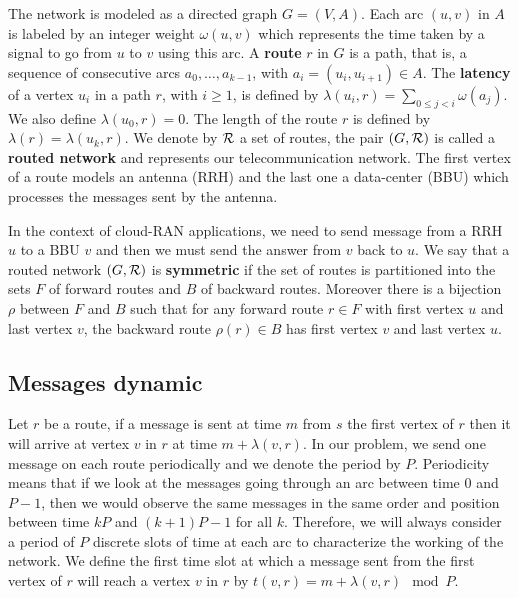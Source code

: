 \documentclass[10pt, conference, letterpaper]{IEEEtran}
\begin{document}
The network is modeled as a directed graph $G=(V,A)$. Each arc  $(u,v)$ in $A$ is labeled by an integer weight $\omega(u,v)$ which represents the time taken by a signal to go from $u$ to $v$ using this arc. A {\bf route} $r$ in $G$ is a path, that is, a sequence of consecutive arcs $a_0, \ldots , a_{k-1}$, with $a_i=(u_i,u_{i+1}) \in A$.  The {\bf latency} of a vertex $u_i$ in a path $r$, with $i \geq 1$, is defined by $\lambda(u_i,r)= \sum\limits_{0 \leq j <i} \omega(a_j)$. We also define $\lambda(u_0,r)=0$. The length of the route $r$ is defined by $\lambda (r)= \lambda (u_k,r)$.
We denote by $\cal R$ a set of routes, the pair $(G,\cal R)$ is called a {\bf routed network} and represents our telecommunication network.
The first vertex of a route models an antenna (RRH) and the last one a data-center (BBU) which processes the messages sent by the antenna.

   In the context of cloud-RAN applications, we need to send message from a RRH $u$ to a BBU $v$ and then 
      we must send the answer from $v$ back to $u$. We say that a routed network $(G, {\cal R})$ is \textbf{symmetric} if the set of routes is partitioned into the sets $F$ of forward routes and $B$ of backward routes. Moreover there is a bijection $\rho$ between $F$ and $B$ such that for any forward route $r \in F$ with first vertex $u$ and last vertex $v$, the backward route $\rho(r) \in B$ has first vertex $v$ and last vertex $u$.
      


   \subsection{Messages dynamic}
      
      Let $r$ be a route, if a message is sent at time $m$ from $s$ the first vertex of $r$ then it will arrive at vertex $v$ in $r$ at time $m + \lambda(v,r)$. In our problem, we send one message on each route periodically and we denote the period by $P$.
      Periodicity means that if we look at the messages going through an arc between time $0$ and $P-1$, then we would observe the same messages in the same order and position between time $kP$ and $(k+1)P -1$ for all $k$. 
      Therefore, we will always consider a period of $P$ discrete slots of time at each arc to characterize the working of the network. We define the first time slot at which a message sent from the first vertex of $r$ will reach a vertex $v$ in $r$ by $t(v,r) = m + \lambda(v,r) \mod P$. 
      
\end{document}

